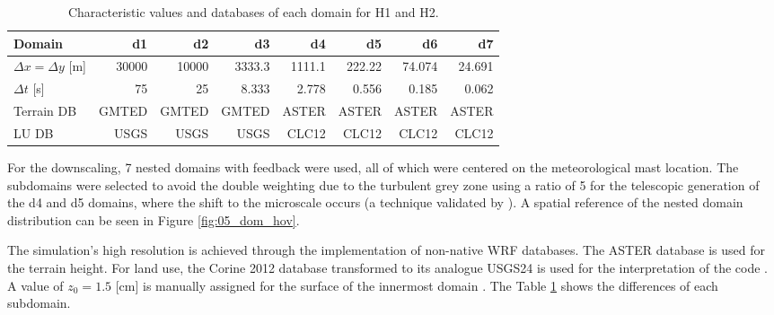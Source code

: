 \begin{table}
	\caption{Characteristic values and databases of each domain for H1 and H2.}\label{tab:05_caract_hov}
	\centering
	\begin{tabular}{lrrrrrrr}
		\toprule
		Domain 				& d1	&	d2	&	d3	&	d4	&	d5	&	d6 &	d7 \\
		\midrule
		$\Delta x=\Delta y$	[m]	 		& 30000 & 10000 & 3333.3 &1111.1&222.22&74.074&24.691  \\
		$\Delta t$	[s]	 		& 75 & 25 & 8.333 &2.778&0.556&0.185&0.062  \\
		Terrain DB		 	& GMTED & GMTED & GMTED &ASTER&ASTER&ASTER&ASTER  \\
		LU DB					& USGS & USGS & USGS &CLC12&CLC12&CLC12&CLC12 \\
		\bottomrule
	\end{tabular}
\end{table}
For the downscaling, 7 nested domains with feedback were used, all of which were centered on the meteorological mast location. The subdomains were selected to avoid the double weighting due to the turbulent grey zone using a ratio of 5 for the telescopic generation of the d4 and d5 domains, where the shift to the microscale occurs (a technique validated by \cite{Green2015}). A spatial reference of the nested domain distribution can be seen in Figure \ref{fig:05_dom_hov}.

The simulation's high resolution is achieved through the implementation of non-native WRF databases. The ASTER database is used for the terrain height. For land use, the Corine 2012 database transformed to its analogue USGS24 is used for the interpretation of the code \citep{Pineda2004}. A value of $z_0=1.5$ [cm] is manually assigned for the surface of the innermost domain \citep{Pea2013}. The Table \ref{tab:05_caract_hov} shows the differences of each subdomain.

